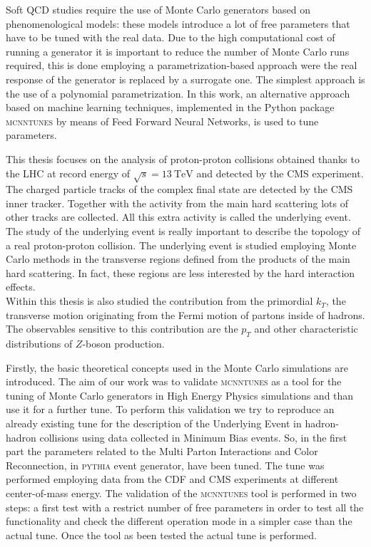 Soft QCD studies require the use of Monte Carlo generators based on phenomenological models: these models introduce a lot of free parameters that have to be tuned with the real data.
Due to the high computational cost of running a generator it is important to reduce the number of Monte Carlo runs required, this is done employing a parametrization-based approach were the real response of the generator is replaced by a surrogate one. The simplest approach is the use of a polynomial parametrization. 
In this work, an alternative approach based on machine learning techniques, implemented in the Python package \textsc{mcnntunes} by means of Feed Forward Neural Networks, is used to tune parameters. 

\medskip
This thesis focuses on the analysis of proton-proton collisions obtained thanks to the LHC at record energy of $\sqrt{s}=13\ \mathrm{TeV}$ and detected by the CMS experiment. The charged particle tracks of the complex final state are detected by the CMS inner tracker. Together with the activity from the main hard scattering lots of other tracks are collected. All this extra activity is called the underlying event. The study of the  underlying event is really important to describe the topology of a real proton-proton collision. The underlying event is studied employing Monte Carlo methods in the transverse regions defined from the products of the main hard scattering. In fact, these regions are less interested by the hard interaction effects.
\\
Within this thesis is also studied the contribution from the primordial $k_T$, the transverse motion originating from the Fermi motion of partons inside of hadrons. The observables sensitive to this contribution are the $p_T$ and other characteristic distributions of $Z$-boson production.
\medskip

Firstly, the basic theoretical concepts used in the Monte Carlo simulations are introduced.
The aim of our work was to validate \textsc{mcnntunes} as a tool for the tuning of Monte Carlo generators in High Energy Physics simulations and than use it for a further tune.
To perform this validation we try to reproduce an already existing tune for the description of the Underlying Event in hadron-hadron collisions using data collected in Minimum Bias events.
So, in the first part the parameters related to the Multi Parton Interactions and Color Reconnection, in \textsc{pythia} event generator, have been tuned. The tune was performed employing data from the CDF and CMS experiments at different center-of-mass energy. The validation of the \textsc{mcnntunes} tool is performed in two steps: a first test with a restrict number of free parameters in order to test all the functionality and check the different operation mode in a simpler case than the actual tune. Once the tool as been tested   the actual tune is performed. 

